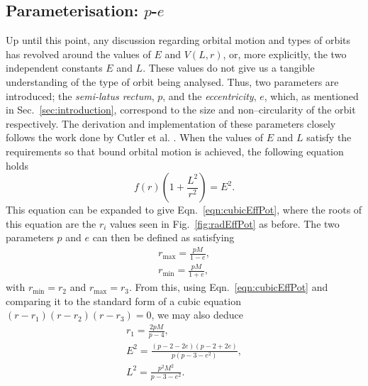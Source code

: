 \subsection{Parameterisation: $p$-$e$}
Up until this point, any discussion regarding orbital motion and types of orbits has revolved around the values of $E$ and $V(L,r)$, or, more explicitly, the two independent constants $E$ and $L$.
These values do not give us a tangible understanding of the type of orbit being analysed.
Thus, two parameters are introduced; the \textit{semi-latus rectum}, $p$, and the \textit{eccentricity}, $e$, which, as mentioned in Sec.~\eqref{sec:introduction}, correspond to the size and non--circularity of the orbit respectively.
The derivation and implementation of these parameters closely follows the work done by Cutler et al. \cite{cutlerEtAl}.
When the values of $E$ and $L$ satisfy the requirements so that bound orbital motion is achieved, the following equation holds
\begin{equation}
    f(r)\left(1+\frac{L^2}{r^2}\right)=E^2.
\end{equation}
This equation can be expanded to give Eqn.~\eqref{eqn:cubicEffPot}, where the roots of this equation are the $r_i$ values seen in Fig.~\eqref{fig:radEffPot} as before.
The two parameters $p$ and $e$ can then be defined as satisfying
\begin{gather}
		r_{\text{max}}=\frac{pM}{1-e},\label{eqn:rmax}\\
        r_{\text{min}}=\frac{pM}{1+e},\label{eqn:rmin}
\end{gather}
with $r_\text{min}=r_2$ and $r_\text{max}=r_3$.
From this, using Eqn.~\eqref{eqn:cubicEffPot} and comparing it to the standard form of a cubic equation $(r-r_1)(r-r_2)(r-r_3)=0$, we may also deduce
\begin{gather}
r_1=\frac{2pM}{p-4},\\
E^2=\frac{(p-2-2e)(p-2+2e)}{p(p-3-e^2)},\\
L^2=\frac{p^2M^2}{p-3-e^2}.
\end{gather}

